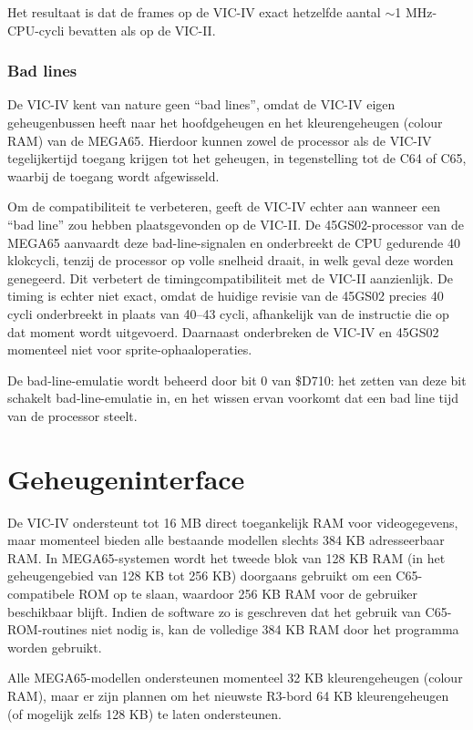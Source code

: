Het resultaat is dat de frames op de VIC-IV exact hetzelfde aantal $\sim$1 MHz-CPU-cycli bevatten als op de VIC-II.

\subsubsection{Bad lines}

De VIC-IV kent van nature geen ``bad lines'', omdat de VIC-IV eigen geheugenbussen heeft naar het hoofdgeheugen en het kleurengeheugen (colour RAM) van de MEGA65. Hierdoor kunnen zowel de processor als de VIC-IV tegelijkertijd toegang krijgen tot het geheugen, in tegenstelling tot de C64 of C65, waarbij de toegang wordt afgewisseld.

Om de compatibiliteit te verbeteren, geeft de VIC-IV echter aan wanneer een ``bad line'' zou hebben plaatsgevonden op de VIC-II. De 45GS02-processor van de MEGA65 aanvaardt deze bad-line-signalen en onderbreekt de CPU gedurende 40 klokcycli, tenzij de processor op volle snelheid draait, in welk geval deze worden genegeerd. Dit verbetert de timingcompatibiliteit met de VIC-II aanzienlijk. De timing is echter niet exact, omdat de huidige revisie van de 45GS02 precies 40 cycli onderbreekt in plaats van 40--43 cycli, afhankelijk van de instructie die op dat moment wordt uitgevoerd. Daarnaast onderbreken de VIC-IV en 45GS02 momenteel niet voor sprite-ophaaloperaties.


De bad-line-emulatie wordt beheerd door bit 0 van \$D710: het zetten van deze bit schakelt bad-line-emulatie in, en het wissen ervan voorkomt dat een bad line tijd van de processor steelt.


\section{Geheugeninterface}

De VIC-IV ondersteunt tot 16 MB direct toegankelijk RAM voor videogegevens, maar momenteel bieden alle bestaande modellen slechts 384 KB adresseerbaar RAM. In MEGA65-systemen wordt het tweede blok van 128 KB RAM (in het geheugengebied van 128 KB tot 256 KB) doorgaans gebruikt om een C65-compatibele ROM op te slaan, waardoor 256 KB RAM voor de gebruiker beschikbaar blijft. Indien de software zo is geschreven dat het gebruik van C65-ROM-routines niet nodig is, kan de volledige 384 KB RAM door het programma worden gebruikt.

Alle MEGA65-modellen ondersteunen momenteel 32 KB kleurengeheugen (colour RAM), maar er zijn plannen om het nieuwste R3-bord 64 KB kleurengeheugen (of mogelijk zelfs 128 KB) te laten ondersteunen.

